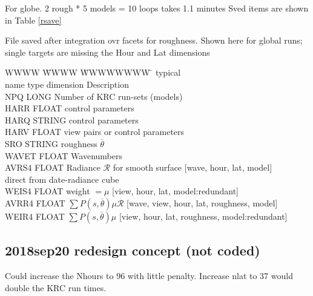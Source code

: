 \documentclass{article}
\begin{document}
For globe. 2 rough * 5 models = 10 loops takes 1.1 minutes
Sved items are shown in Table \ref{rsave}

\begin{table} \caption[Roungness integration output]{File saved after integration ovr facets for roughness. Shown here for global runs; single targets are missing the Hour and Lat dimensions }  \label{rsave}
\begin{tabbing} 
WWWW \= WWWW \=WWWWWWWW \=   \kill 
     \>     \> typical \>  \\
name \> type \> dimension \> \hspace{2.cm} Description \\
NPQ   \>  LONG          \>  Number of KRC run-sets (models) \\
HARR \>   FLOAT  \> [12] \>   control parameters  \\
HARQ \>   STRING \> [9] \>    control parameters \\
HARV \>   FLOAT  \> [12] \>   view pairs or control parameters\\ 
SRO  \>   STRING \> [2] \> roughness $\overline{\theta } $\\ 
WAVET  \> FLOAT  \> [9] \> Wavenumbers \\
AVRS4  \> FLOAT \>  [9,48,19,5] \> Radiance  $\mathcal{R}$ for smooth surface [wave, hour, lat, model] \\
\> \> \> direct from date-radiance cube \\
WEIS4 \>  FLOAT \>  [18,48,19,5] \> weight $=\mu $ [view, hour, lat, model:redundant]  \\
AVRR4 \>  FLOAT  \> [9,18,48,19,2,5] \> $\sum P(s,\overline{\theta}) \mu \mathcal{R}$ [wave, view, hour, lat, roughness, model] \\
WEIR4 \>  FLOAT  \> [18,48,19,2,5] \> $\sum P(s,\overline{\theta}) \mu$ [view, hour, lat, roughness, model:redundant]  \\
\end{tabbing}
\vspace{-5.mm}
\hrulefill \end{table} 

\subsection{2018sep20 redesign concept (not coded)}

 Could increase the Nhours to 96 with little penalty. Increase nlat to 37 would double the KRC run times.
\end{document}
